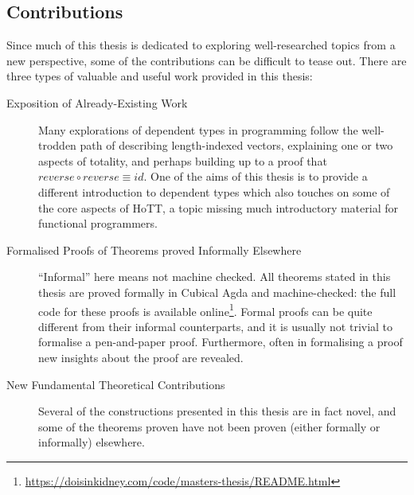 \subsection{Contributions}
Since much of this thesis is dedicated to exploring well-researched topics from
a new perspective, some of the contributions can be difficult to tease out.
There are three types of valuable and useful work provided in this thesis:
\begin{description}
  \item[Exposition of Already-Existing Work]
    Many explorations of dependent types in programming follow the well-trodden
    path of describing length-indexed vectors, explaining one or two aspects of
    totality, and perhaps building up to a proof that \(\mathit{reverse} \circ
    \mathit{reverse} \equiv \mathit{id}\).
    One of the aims of this thesis is to provide a different introduction to
    dependent types which also touches on some of the core aspects of HoTT, a
    topic missing much introductory material for functional programmers.
  \item[Formalised Proofs of Theorems proved Informally Elsewhere]
    ``Informal'' here means not machine checked.
    All theorems stated in this thesis are proved formally in Cubical Agda and
    machine-checked: the full code for these proofs is available
    online\footnote{\url{https://doisinkidney.com/code/masters-thesis/README.html}}.
    Formal proofs can be quite different from their informal counterparts, and
    it is usually not trivial to formalise a pen-and-paper proof.
    Furthermore, often in formalising a proof new insights about the proof are
    revealed.
  \item[New Fundamental Theoretical Contributions]
    Several of the constructions presented in this thesis are in fact novel, and
    some of the theorems proven have not been proven (either formally or
    informally) elsewhere.
\end{description}

